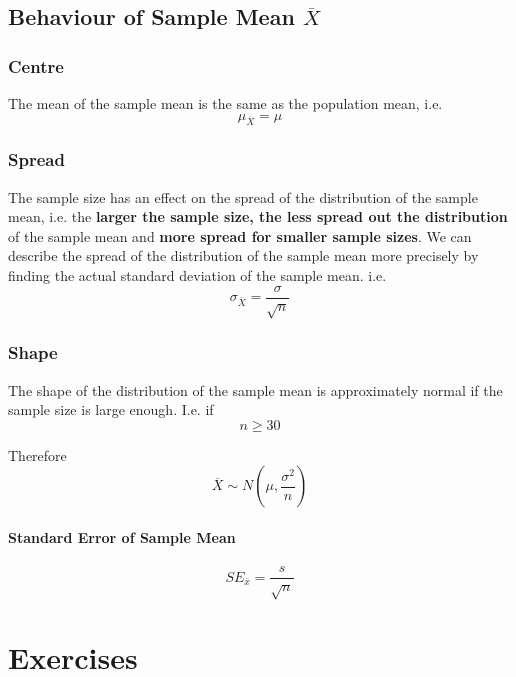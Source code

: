\documentclass[12pt letter]{report}
\begin{document}
\section{Behaviour of Sample Mean $\overline{X}$}

\subsection{Centre}

The mean of the sample mean is the same as the population mean, i.e.
\[
  \mu_{\overline{X}} = \mu
\]

\subsection{Spread}

The sample size has an effect on the spread of the distribution of the sample mean, i.e. the \textbf{larger the sample
  size, the less spread out the distribution} of the sample mean and \textbf{more spread for smaller sample sizes}. We can
describe the spread of the distribution of the sample mean more precisely by finding the actual standard deviation of the
sample mean. i.e.
\[
  \sigma_{\overline{X}} = \frac{\sigma}{\sqrt{n}}
\]

\subsection{Shape}

The shape of the distribution of the sample mean is approximately normal if the sample size is large enough. I.e. if
\[
  n \geq 30
\]

Therefore
\[
  \overline{X} \sim N \left( \mu, \frac{\sigma^2}{n} \right)
\]


\subsubsection{Standard Error of Sample Mean}

\[
  SE_{\overline{x}}= \frac{s}{\sqrt{n}}
\]


\chapter{Exercises}

\end{document}
